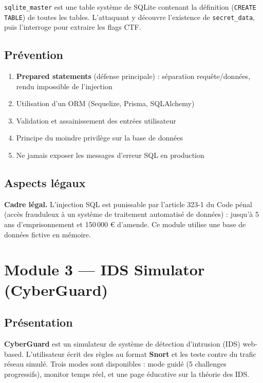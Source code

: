 \documentclass[12pt,a4paper]{report}
\newcommand{\code}[1]{\texttt{#1}}
\begin{document}
\code{sqlite\_master} est une table système de SQLite contenant la
définition (\code{CREATE TABLE}) de toutes les tables. L'attaquant
y découvre l'existence de \code{secret\_data}, puis l'interroge pour
extraire les flags CTF.

\section{Prévention}

\begin{enumerate}
  \item \textbf{Prepared statements} (défense principale) : séparation
        requête/données, rendu impossible de l'injection
  \item Utilisation d'un ORM (Sequelize, Prisma, SQLAlchemy)
  \item Validation et assainissement des entrées utilisateur
  \item Principe du moindre privilège sur la base de données
  \item Ne jamais exposer les messages d'erreur SQL en production
\end{enumerate}

\section{Aspects légaux}

\begin{warnbox}
  \textbf{Cadre légal.}
  L'injection SQL est punissable par l'article 323-1 du Code pénal
  (accès frauduleux à un système de traitement automatisé de données) :
  jusqu'à 5 ans d'emprisonnement et 150\,000 € d'amende.
  Ce module utilise une base de données fictive en mémoire.
\end{warnbox}

\chapter{Module 3 — IDS Simulator (CyberGuard)}

\section{Présentation}

\textbf{CyberGuard} est un simulateur de système de détection d'intrusion
(IDS) web-based. L'utilisateur écrit des règles au format \textbf{Snort}
et les teste contre du trafic réseau simulé. Trois modes sont disponibles :
mode guidé (5 challenges progressifs), monitor temps réel, et une page
éducative sur la théorie des IDS.
\end{document}
